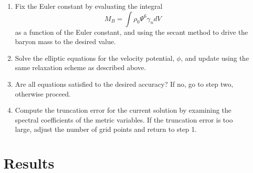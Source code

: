 \begin{enumerate}
\item Fix the Euler constant by evaluating the integral
\begin{equation}
M_{B}=\int \rho_0\Psi^6\gamma_ndV
\end{equation}
as a function of the Euler
constant, and using the secant method to drive the baryon mass to the
desired value.

\item Solve the elliptic equations for the velocity potential, $\phi$,
  and update using the same relaxation scheme as described above.

\item Are all equations satisfied to the desired accuracy? If no, go
  to step two, otherwise proceed.

\item Compute the truncation error for the current solution by
  examining the spectral coefficients of the metric variables. If the
  truncation error is too large, adjust the number of grid points and
  return to step 1.

\end{enumerate}

\section{Results}




